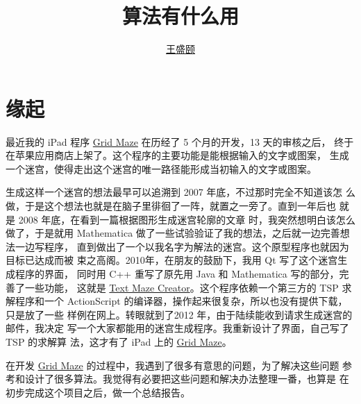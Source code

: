 \documentclass[cs4size,a4paper,adobefonts]{ctexart}
\newcommand{\GridMaze}{\href{http://itunes.apple.com/app/grid-maze/id553265800?mt=8}{Grid Maze}}
\begin{document}
\title{\bfseries 算法有什么用}
\author{\href{mailto:txyyss@gmail.com}{王盛颐}}
\date{}
\maketitle

\section*{缘起}
最近我的 iPad 程序 \GridMaze{} 在历经了 5 个月的开发，13 天的审核之后，
终于在苹果应用商店上架了。这个程序的主要功能是能根据输入的文字或图案，
生成一个迷宫，使得走出这个迷宫的唯一路径能形成当初输入的文字或图案。

生成这样一个迷宫的想法最早可以追溯到 2007 年底，不过那时完全不知道该怎
么做，于是这个想法也就是在脑子里徘徊了一阵，就置之一旁了。直到一年后也
就是 2008 年底，在看到一篇根据图形生成迷宫轮廓的文章
\cite{Xu:2007:ImageMaze}时，我突然想明白该怎么做了，于是就用
Mathematica 做了一些试验验证了我的想法，之后就一边完善想法一边写程序，
直到做出了一个以我名字为解法的迷宫。这个原型程序也就因为目标已达成而被
束之高阁。2010年，在朋友的鼓励下，我用 Qt 写了这个迷宫生成程序的界面，
同时用 C++ 重写了原先用 Java 和 Mathematica 写的部分，完善了一些功能，
这就是
\href{https://sites.google.com/site/txyyss/projects/text-maze-creator}{Text
  Maze Creator}。这个程序依赖一个第三方的 TSP 求解程序和一个
ActionScript 的编译器，操作起来很复杂，所以也没有提供下载，只是放了一些
样例在网上。转眼就到了2012 年，由于陆续能收到请求生成迷宫的邮件，我决定
写一个大家都能用的迷宫生成程序。我重新设计了界面，自己写了 TSP 的求解算
法，这才有了 iPad 上的 \GridMaze。

在开发 \GridMaze{} 的过程中，我遇到了很多有意思的问题，为了解决这些问题
参考和设计了很多算法。我觉得有必要把这些问题和解决办法整理一番，也算是
在初步完成这个项目之后，做一个总结报告。



\end{document}
